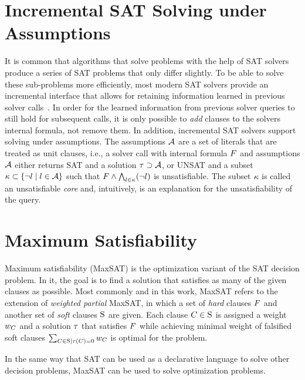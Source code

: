 \section{Incremental SAT Solving under Assumptions\label{sec:inc-sat}}

It is common that algorithms that solve problems with the help of SAT solvers produce a series of SAT problems that only differ slightly.
To be able to solve these sub-problems more efficiently, most modern SAT solvers provide an incremental interface that allows for retaining information learned in previous solver calls~\autocite{DBLP:journals/entcs/EenS03,handbook2-cdcl}.
In order for the learned information  from previous solver queries to still hold for subsequent calls, it is only possible to \emph{add} clauses to the solvers internal formula, not remove them.
In addition, incremental SAT solvers support solving under assumptions.
The assumptions $\mathcal{A}$ are a set of literals that are treated as unit clauses, i.e., a solver call with internal formula $F$ and assumptions $\mathcal{A}$ either returns SAT and a solution $\tau \supset \mathcal{A}$, or UNSAT and a subset $\kappa \subset \{\lnot l \mid l\in\mathcal{A}\}$ such that $F \land \bigwedge_{l \in \kappa} (\lnot l)$ is unsatisfiable.
The subset $\kappa$ is called an unsatisfiable \emph{core} and, intuitively, is an explanation for the unsatisfiability of the query.

\section{Maximum Satisfiability\label{sec:max-sat}}

Maximum satisfiability (MaxSAT) is the optimization variant of the SAT decision problem.
In it, the goal is to find a solution that satisfies as many of the given clauses as possible.
Most commonly and in this work, MaxSAT refers to the extension of \emph{weighted partial} MaxSAT, in which a set of \emph{hard} clauses $F$ and another set of \emph{soft} clauses $\textsc{S}$ are given.
Each clause $C \in \textsc{S}$ is assigned a weight $w_C$ and a solution $\tau$ that satisfies $F$ while achieving minimal weight of falsified soft clauses $\sum_{C\in\textsc{S} \mid \tau(C)=0} w_C$ is optimal for the problem.

In the same way that SAT can be used as a declarative language to solve other decision problems, MaxSAT can be used to solve optimization problems.

